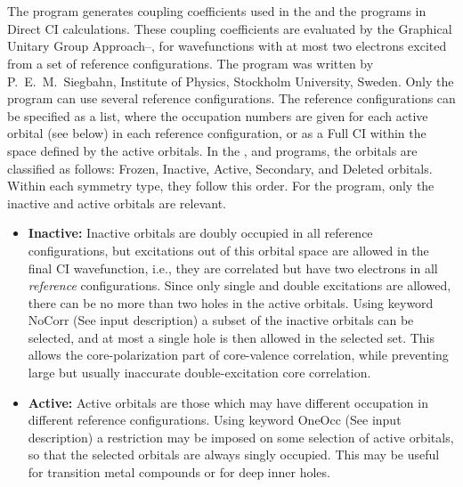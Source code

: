 
\section{}
\label{UG:sec:Guga}

The  program generates coupling coefficients
used in the  and the  programs
in Direct CI calculations\cite{Roos:72}.
These coupling coefficients are evaluated by the Graphical Unitary
Group Approach\cite{Shavitt:77}--\cite{Siegbahn:80},
for wavefunctions with at most two electrons excited from a set of
reference configurations. The program was written by P.~E.~M.~Siegbahn,
Institute of Physics, Stockholm University, Sweden.
Only the  program can use several reference
configurations. The reference configurations can be specified as a
list, where the occupation numbers are given for each active orbital
(see below) in each reference configuration, or as a Full CI
 within
the space defined by the active orbitals. In the , 
and  programs, the orbitals are classified as follows:
Frozen, Inactive, Active, Secondary, and Deleted orbitals. Within each
symmetry type, they follow this order. For the  program,
only the inactive and active orbitals are relevant.
\begin{itemize}
\itemsep 9pt plus 3pt minus 3pt
\item
{\bf Inactive:} Inactive orbitals are doubly occupied
in all reference configurations, but excitations out of this orbital
space are allowed in the final CI wavefunction, i.e., they are
correlated but have two electrons in all {\em reference} configurations.
Since only single and double excitations are allowed, there can be no
more than two holes in the active orbitals.
Using keyword NoCorr (See input description) a subset of the
inactive orbitals can be selected, and at most a single hole
is then allowed in the selected set. This allows the core-polarization
part of core-valence correlation, while preventing large but usually
inaccurate double-excitation core correlation.
\item
{\bf Active:} Active orbitals are those which may have
different occupation in different reference configurations.
Using keyword  OneOcc (See input description) a restriction may be
imposed on some selection of active orbitals, so that the selected
orbitals are always singly occupied. This may be useful for transition
metal compounds or for deep inner holes.
\end{itemize}

